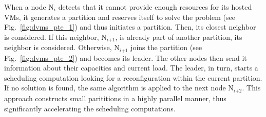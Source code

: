 When a node N\(_{\textit{i}}\)
detects that it cannot provide enough resources for its hosted VMs, it
generates a partition and reserves itself to solve the problem (see
Fig.~\ref{fig:dvms_pte_1}) and thus initiates a partition. Then, its
closest neighbor %
is considered.
%
If this neighbor, N\(_{\textit{i+1}}\),
is already part of another partition, its neighbor is considered.
Otherwise, N\(_{\textit{i+1}}\)
joins the partition (see Fig.~\ref{fig:dvms_pte_2}) and becomes its
leader.
The other nodes then send it information about their
capacities and current load. The leader, in turn, starts a scheduling
computation looking for a reconfiguration within the current
partition. If no solution is found, the same algorithm is applied to
the next node N\(_{\textit{i+2}}\).
This approach constructs small parititions in a highly parallel
manner, thus significantly accelerating the scheduling computations.




